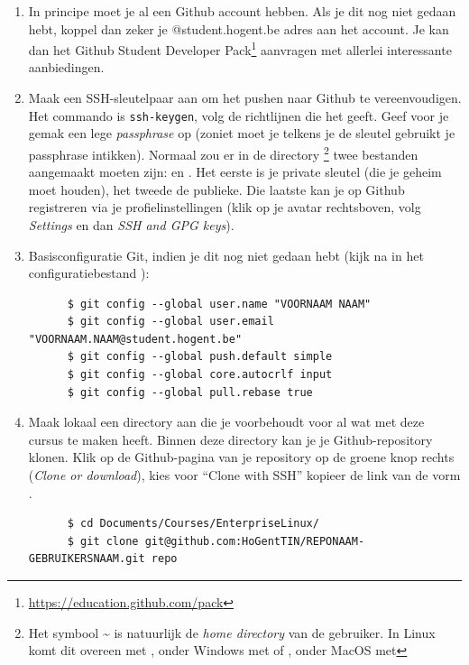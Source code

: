 \begin{enumerate}
  \item In principe moet je al een Github account hebben. Als je dit nog niet gedaan hebt, koppel dan zeker je @student.hogent.be adres aan het account. Je kan dan het Github Student Developer Pack\footnote{\url{https://education.github.com/pack}} aanvragen met allerlei interessante aanbiedingen.
  \item Maak een SSH-sleutelpaar aan om het pushen naar Github te vereenvoudigen. Het commando is \texttt{ssh-keygen}, volg de richtlijnen die het geeft. Geef voor je gemak een lege \emph{passphrase} op (zoniet moet je telkens je de sleutel gebruikt je passphrase intikken). Normaal zou er in de directory \footnote{Het symbool {\textasciitilde} is natuurlijk de \emph{home directory} van de gebruiker. In Linux komt dit overeen met , onder Windows met  of , onder MacOS met } twee bestanden aangemaakt moeten zijn:  en . Het eerste is je private sleutel (die je geheim moet houden), het tweede de publieke. Die laatste kan je op Github registreren via je profielinstellingen (klik op je avatar rechtsboven, volg \emph{Settings} en dan \emph{SSH and GPG keys}).

  \item Basisconfiguratie Git, indien je dit nog niet gedaan hebt (kijk na in het configuratiebestand ):

    \begin{verbatim}
      $ git config --global user.name "VOORNAAM NAAM"
      $ git config --global user.email "VOORNAAM.NAAM@student.hogent.be"
      $ git config --global push.default simple
      $ git config --global core.autocrlf input
      $ git config --global pull.rebase true
    \end{verbatim}

  \item Maak lokaal een directory aan die je voorbehoudt voor al wat met deze cursus te maken heeft. Binnen deze directory kan je je Github-repository klonen. Klik op de Github-pagina van je repository op de groene knop rechts (\emph{Clone or download}), kies voor ``Clone with SSH'' kopieer de link van de vorm .

    \begin{verbatim}
      $ cd Documents/Courses/EnterpriseLinux/
      $ git clone git@github.com:HoGentTIN/REPONAAM-GEBRUIKERSNAAM.git repo
    \end{verbatim}


\end{enumerate}

